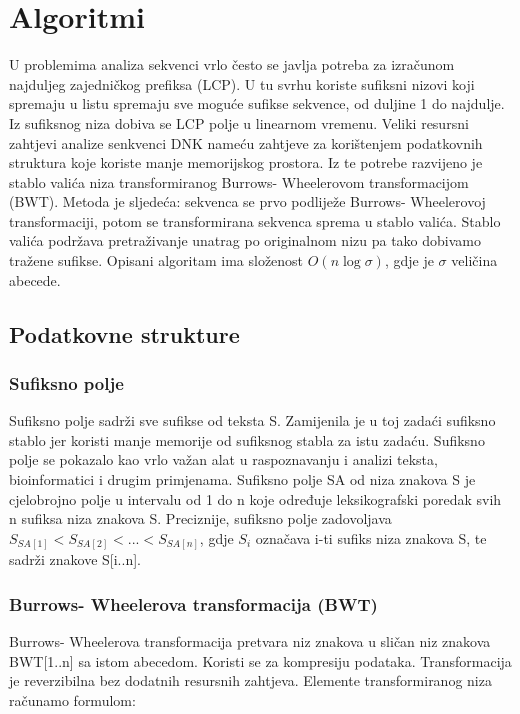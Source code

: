 \documentclass[11pt]{article}
\begin{document}
\section{Algoritmi}
U problemima analiza sekvenci vrlo često se javlja potreba za izračunom najduljeg zajedničkog prefiksa (LCP). U tu svrhu koriste sufiksni nizovi koji spremaju u listu spremaju sve moguće sufikse sekvence, od duljine 1 do najdulje. Iz sufiksnog niza dobiva se LCP polje u linearnom vremenu. 
Veliki resursni zahtjevi analize senkvenci DNK nameću zahtjeve za korištenjem podatkovnih struktura koje koriste manje memorijskog prostora. Iz te potrebe razvijeno je stablo valića niza transformiranog Burrows- Wheelerovom transformacijom (BWT).
Metoda je sljedeća: sekvenca se prvo podliježe Burrows- Wheelerovoj transformaciji, potom se transformirana sekvenca sprema u stablo valića. Stablo valića podržava pretraživanje unatrag po originalnom nizu pa tako dobivamo tražene sufikse. Opisani algoritam ima složenost $O(n\log\sigma)$, gdje je $\sigma$ veličina abecede.

\subsection{Podatkovne strukture}

\subsubsection{Sufiksno polje}
Sufiksno polje sadrži sve sufikse od teksta S. Zamijenila je u toj zadaći sufiksno stablo jer koristi manje memorije od sufiksnog stabla za istu zadaću. Sufiksno polje se pokazalo kao vrlo važan alat u raspoznavanju i analizi teksta, bioinformatici i drugim primjenama. 
Sufiksno polje SA od niza znakova S je cjelobrojno polje u intervalu od 1 do n koje određuje leksikografski poredak svih n sufiksa niza znakova S. Preciznije, sufiksno polje zadovoljava $ S_{SA[1]} < S_{SA[2]} < ... < S_{SA[n]}$, gdje $ S_i $ označava i-ti sufiks niza znakova S, te sadrži znakove S[i..n].
 
\subsubsection{Burrows- Wheelerova transformacija (BWT)}
Burrows- Wheelerova transformacija pretvara niz znakova u sličan niz znakova BWT[1..n] sa istom abecedom. Koristi se za kompresiju podataka. Transformacija je reverzibilna bez dodatnih resursnih zahtjeva. Elemente transformiranog niza računamo formulom:
\end{document}
